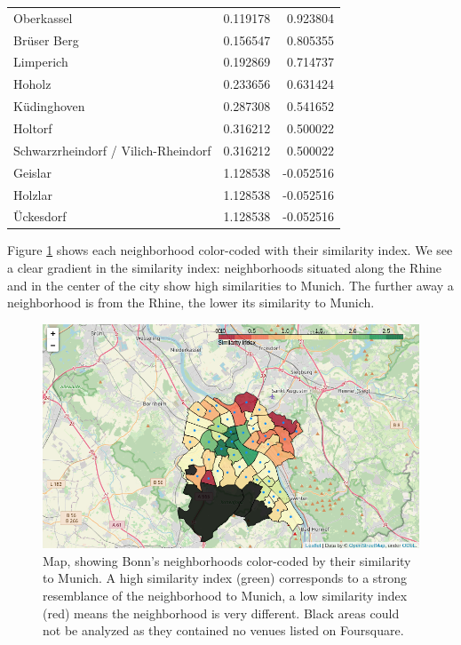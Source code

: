 \documentclass[UKenglish]{scrreprt}
\begin{document}
\begin{table}
\begin{tabular}{lrr}
		Oberkassel                          &                 0.119178 &              0.923804 \\
		Brüser Berg                         &                 0.156547 &              0.805355 \\
		Limperich                           &                 0.192869 &              0.714737 \\
		Hoholz                              &                 0.233656 &              0.631424 \\
		Küdinghoven                         &                 0.287308 &              0.541652 \\
		Holtorf                             &                 0.316212 &              0.500022 \\
		Schwarzrheindorf / Vilich-Rheindorf &                 0.316212 &              0.500022 \\
		Geislar                             &                 1.128538 &             -0.052516 \\
		Holzlar                             &                 1.128538 &             -0.052516 \\
		Ückesdorf                           &                 1.128538 &             -0.052516 \\
		\bottomrule
	\end{tabular}
\end{table}

Figure \ref{fig:map_similarity} shows each neighborhood color-coded with their similarity index. We see a clear gradient in the similarity index: neighborhoods situated along the Rhine and in the center of the city show high similarities to Munich. The further away a neighborhood is from the Rhine, the lower its similarity to Munich. 

\begin{figure}[htbp]
	\includegraphics[width=\linewidth]{Figs/Map_similarity_Neighborhoods}
	\caption{Map, showing Bonn's neighborhoods color-coded by their similarity to Munich. A high similarity index (green) corresponds to a strong resemblance of the neighborhood to Munich, a low similarity index (red) means the neighborhood is very different. Black areas could not be analyzed as they contained no venues listed on Foursquare.}
	\label{fig:map_similarity}
\end{figure}
\end{document}
